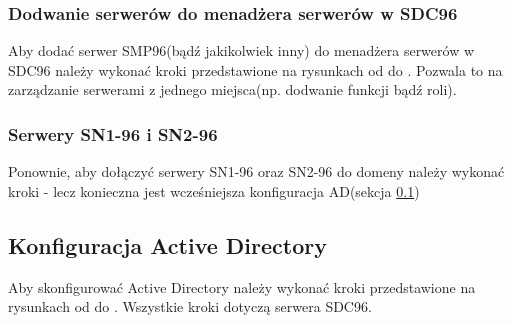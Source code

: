 \clearpage

\clearpage

\subsubsection{Dodwanie serwerów do menadżera serwerów w SDC96}
Aby dodać serwer SMP96(bądź jakikolwiek inny) do menadżera serwerów w SDC96 należy wykonać kroki przedstawione na rysunkach od  do . Pozwala to na zarządzanie serwerami z jednego miejsca(np. dodwanie funkcji bądź roli).

\clearpage

\clearpage

\subsubsection{Serwery SN1-96 i SN2-96}

Ponownie, aby dołączyć serwery SN1-96 oraz SN2-96 do domeny należy wykonać kroki  -  lecz konieczna jest wcześniejsza konfiguracja AD(sekcja \ref{sec:AD})


\clearpage


\clearpage


\clearpage


\subsection{Konfiguracja Active Directory}
\label{sec:AD}
Aby skonfigurować Active Directory należy wykonać kroki przedstawione na rysunkach od  do . Wszystkie kroki dotyczą serwera SDC96.\\


